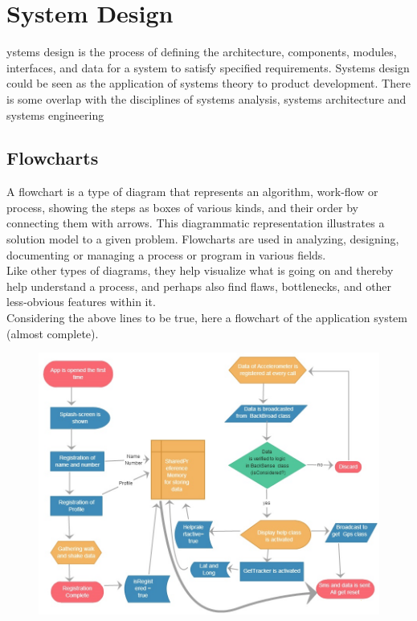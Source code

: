 %
%
\let\textcircled=\pgftextcircled
\chapter{System Design}
\label{chap:intro}

ystems design is the process of defining the architecture, components, modules, interfaces, and data for a system to satisfy specified requirements. Systems design could be seen as the application of systems theory to product development. There is some overlap with the disciplines of systems analysis, systems architecture and systems engineering





\section{Flowcharts}
\label{sec:sec01}
A flowchart is a type of diagram that represents an algorithm, work-flow or process, showing the steps as boxes of various kinds, and their order by connecting them with arrows. This diagrammatic representation illustrates a solution model to a given problem. Flowcharts are used in analyzing, designing, documenting or managing a process or program in various fields.\\
 Like other types of diagrams, they help visualize what is going on and thereby help understand a process, and perhaps also find flaws, bottlenecks, and other less-obvious features within it. \\
Considering the above lines to be true, here a flowchart of the application system (almost complete). 


\begin{figure}[h]
	\centering
	\includegraphics[height=0.6\textheight]{fig01/d_flowc}
	\label{fig:RHP01}

\end{figure}

